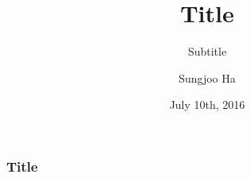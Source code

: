 

\usepackage{kotex}
\usepackage{multirow}
\usepackage{tikz}
\usepackage{graphicx}
\usepackage[normal, tight, center]{subfigure}
\usepackage{amssymb}
\usepackage{pgf}
\usepackage{url}
\usepackage{hyperref}
\hypersetup{colorlinks=true}
\usepackage{mathrsfs}
\usepackage{mathtools}
\usepackage{algorithm2e}
\usepackage{setspace}


\DeclareMathOperator*{\argmin}{\arg\!\min}
\DeclareMathOperator*{\argmax}{\arg\!\max}




\def\supertiny{ \font\supertinyfont = cmr10 at 7pt \relax \supertinyfont}


\title[\hspace{2em}\insertframenumber/\inserttotalframenumber]{\huge{Title}}
\subtitle{Subtitle}
\author[Sungjoo Ha]{Sungjoo Ha}
\date{July 10th, 2016}




\frame{
\maketitle
}


\begin{frame}
    \frametitle{Title}
\end{frame}


